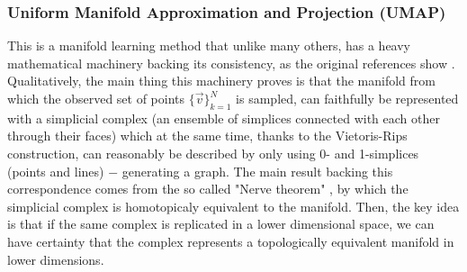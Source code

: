 \documentclass[11pt, a4paper, twoside]{article} %
\begin{document}
\subsubsection*{Uniform Manifold Approximation and Projection (UMAP)}\vspace{-0.15cm}
This is a manifold learning method that unlike many others, has a heavy mathematical machinery backing its consistency, as the original references show \cite{umap,umaplearn}. Qualitatively, the main thing this machinery proves is that the manifold from which the observed set of points $\{\vec{v}\}_{k=1}^N$ is sampled, can faithfully be represented with a simplicial complex (an ensemble of simplices connected with each other through their faces) which at the same time, thanks to the Vietoris-Rips construction, can reasonably be described by only using 0- and 1-simplices (points and lines) $-$ generating a graph. The main result backing this correspondence comes from the so called "Nerve theorem" \cite{ umap}, by which the simplicial complex is homotopicaly equivalent to the manifold. Then, the key idea is that if the same complex is replicated in a lower dimensional space, we can have certainty that the complex represents a topologically equivalent manifold in lower dimensions. 
\end{document}
